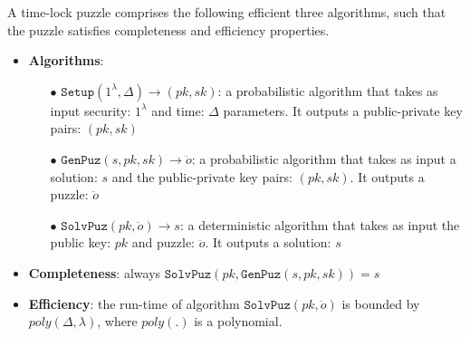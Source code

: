 \begin{definition}\label{Def::Time-lock-Puzzle} A time-lock puzzle comprises the following efficient three algorithms, such that the puzzle satisfies completeness and efficiency properties. 
\begin{itemize}[leftmargin=.37cm]
\item \textbf{Algorithms}:
\begin{itemize}
\item[$\bullet$]$\mathtt{Setup}(1^{\scriptscriptstyle\lambda},\Delta)\rightarrow (pk,sk)$: a probabilistic algorithm that takes as input  security: $1^{\scriptscriptstyle\lambda}$ and time:  $\Delta$ parameters. It outputs a public-private key pairs: $(pk,sk)$

\item[$\bullet$]$\mathtt{GenPuz}(s, pk, sk)\rightarrow \ddot{o}$: a probabilistic algorithm that takes as input a solution: $s$ and the public-private key pairs: $(pk,sk)$. It  outputs a puzzle: $\ddot{o}$

\item[$\bullet$]$\mathtt{SolvPuz}(pk,\ddot{o})\rightarrow s$:  a deterministic algorithm that takes as input  the public key: $pk$ and  puzzle: $\ddot{o}$. It outputs a solution: $s$
\end{itemize}
\item \textbf{Completeness}: always  $\mathtt{SolvPuz}(pk,\mathtt{GenPuz}(s,pk,sk))=s$


\item \textbf{Efficiency}: the run-time of algorithm $\mathtt{SolvPuz}(pk,\ddot{o})$ is bounded by  $poly(\Delta,\lambda)$, where $poly(.)$ is a  polynomial.
\end{itemize}
\end{definition}


